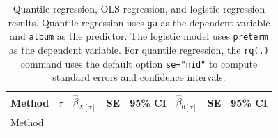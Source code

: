 \documentclass[
  letterpaper,
  DIV=11,
  numbers=noendperiod]{scrartcl}
\begin{document}
\begin{longtable}[]{@{}
  >{\raggedright\arraybackslash}p{}
  >{\raggedright\arraybackslash}p{}
  >{\raggedright\arraybackslash}p{}
  >{\raggedright\arraybackslash}p{}
  >{\raggedright\arraybackslash}p{}
  >{\raggedright\arraybackslash}p{}
  >{\raggedright\arraybackslash}p{}
  >{\raggedright\arraybackslash}p{}@{}}
\caption{Quantile regression, OLS regression, and logistic regression
results. Quantile regression uses \protect\texttt{ga} as the dependent
variable and \protect\texttt{album} as the predictor. The logistic model
uses \protect\texttt{preterm} as the dependent variable. For quantile
regression, the \protect\texttt{rq(.)} command uses the default option
\protect\texttt{se="nid"} to compute standard errors and confidence
intervals.}\label{tbl-fqr-pmsbetasqr}\tabularnewline
\toprule\noalign{}
\begin{minipage}[b]{\linewidth}\raggedright
Method
\end{minipage} & \begin{minipage}[b]{\linewidth}\raggedright
\(\tau\)
\end{minipage} & \begin{minipage}[b]{\linewidth}\raggedright
\(\hat{\beta}_{X[\tau]}\)
\end{minipage} & \begin{minipage}[b]{\linewidth}\raggedright
SE
\end{minipage} & \begin{minipage}[b]{\linewidth}\raggedright
95\% CI
\end{minipage} & \begin{minipage}[b]{\linewidth}\raggedright
\(\hat{\beta}_{0[\tau]}\)
\end{minipage} & \begin{minipage}[b]{\linewidth}\raggedright
SE
\end{minipage} & \begin{minipage}[b]{\linewidth}\raggedright
95\% CI
\end{minipage} \\
\midrule\noalign{}
\endfirsthead
\toprule\noalign{}
\begin{minipage}[b]{\linewidth}\raggedright
Method
\end{minipage} & \begin{minipage}[b]{\linewidth}\raggedright

\end{minipage}
\end{longtable}
\end{document}
